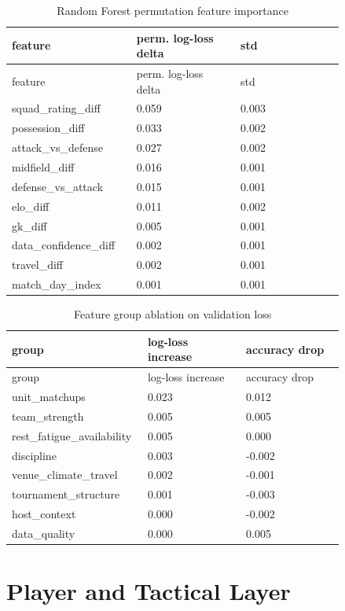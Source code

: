 \documentclass[10pt]{article}
\begin{document}
\begin{longtable}{p{0.280\linewidth}p{0.280\linewidth}p{0.280\linewidth}}
\caption{Random Forest permutation feature importance}\\
\toprule
feature & perm. log-loss delta & std \\
\midrule
\endfirsthead
\toprule
feature & perm. log-loss delta & std \\
\midrule
\endhead
squad\_rating\_diff & 0.059 & 0.003 \\
possession\_diff & 0.033 & 0.002 \\
attack\_vs\_defense & 0.027 & 0.002 \\
midfield\_diff & 0.016 & 0.001 \\
defense\_vs\_attack & 0.015 & 0.001 \\
elo\_diff & 0.011 & 0.002 \\
gk\_diff & 0.005 & 0.001 \\
data\_confidence\_diff & 0.002 & 0.001 \\
travel\_diff & 0.002 & 0.001 \\
match\_day\_index & 0.001 & 0.001 \\
\bottomrule
\end{longtable}


\begin{longtable}{p{0.280\linewidth}p{0.280\linewidth}p{0.280\linewidth}}
\caption{Feature group ablation on validation loss}\\
\toprule
group & log-loss increase & accuracy drop \\
\midrule
\endfirsthead
\toprule
group & log-loss increase & accuracy drop \\
\midrule
\endhead
unit\_matchups & 0.023 & 0.012 \\
team\_strength & 0.005 & 0.005 \\
rest\_fatigue\_availability & 0.005 & 0.000 \\
discipline & 0.003 & -0.002 \\
venue\_climate\_travel & 0.002 & -0.001 \\
tournament\_structure & 0.001 & -0.003 \\
host\_context & 0.000 & -0.002 \\
data\_quality & 0.000 & 0.005 \\
\bottomrule
\end{longtable}


\section{Player and Tactical Layer}
\end{document}
